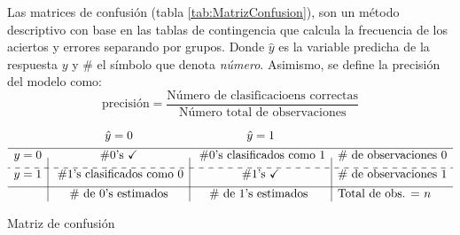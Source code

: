 \documentclass[../Main/Main.tex]{subfiles}
\begin{document}
Las matrices de confusión (tabla \ref{tab:MatrizConfusion}), son un método descriptivo con base en las tablas de contingencia que calcula la frecuencia de los aciertos y errores separando por grupos. Donde $\hat{y}$ es la variable predicha de la respuesta $y$ y $\#$ el símbolo que denota \textit{número}. Asimismo, se define la precisión del modelo como:
$$ \text{precisión} = \dfrac{\text{Número de clasificacioens correctas}}{\text{Número total de observaciones}}$$

\begin{table}[H]
\centering
$\begin{array}{c|c|c|l}
~ & \hat{y} = 0 & \hat{y} = 1 & ~ \\[4pt]
\hline
y = 0 & \#0\text{'s } \checkmark & \;\# 0\text{'s clasificados como }1 & \#\text{ de observaciones 0} \\[4pt]
\cdashline{1-4}
y = 1 & \;\# 1\text{'s clasificados como }0 & \# 1\text{'s } \checkmark & \#\text{ de observaciones 1} \\[4pt]
\hline
~ & \# \text{ de 0's estimados} & \# \text{ de 1's estimados } &  \text{Total de obs. = } n
\end{array}$
\caption{Matriz de confusión}
\label{tab:MatrizConfusion}
\end{table}
\end{document}
